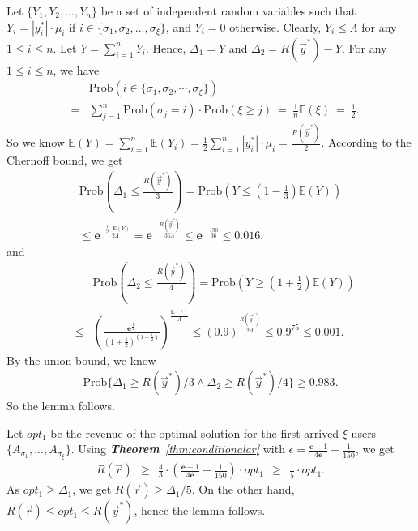 \documentclass[10pt,journal,compsoc]{IEEEtran}
\begin{document}
\begin{IEEEproof} 
Let $\{Y_1,Y_2,...,Y_n\}$ be a set of independent random variables such that  $Y_{i}=|y^*_{i}|\cdot \mu_{i}$ if $i\in \{\sigma_1,\sigma_2,...,\sigma_{\xi}\}$, and $Y_{i}=0$ otherwise. Clearly, $Y_i\leq \Lambda$ for any $1\leq i\leq n$. Let $Y=\sum_{i=1}^n Y_{i}$. Hence, $\Delta_1=Y$ and $\Delta_2=R(\vec{y}^*)-Y$. For any $1\leq i\leq n$, we have
\begin{eqnarray}
    &&\mathrm{Prob}\left(i\in\{\sigma_1,\sigma_2,\cdots,\sigma_{\xi}\}\right) \nonumber\\
    &=& \sum_{j=1}^n \mathrm{Prob}(\sigma_j=i)\cdot \mathrm{Prob}(\xi\geq j)~=~\frac{1}{n}\mathbb{E}(\xi)~=~\frac{1}{2}. \nonumber
  \end{eqnarray}
So we know $\mathbb{E}(Y) = \sum_{i=1}^n \mathbb{E}(Y_i) = \frac{1}{2}\sum_{i=1}^n |y^*_{i}|\cdot \mu_{i} = \frac{R(\vec{y}^*)}{2}$. According to the Chernoff bound, we get
\begin{eqnarray}
    \mathrm{Prob}\left(\Delta_1\leq \frac{R(\vec{y}^*)}{3}\right)=\mathrm{Prob}\left(Y\leq \left(1-\frac{1}{3}\right)\mathbb{E}(Y) \right) \nonumber\\
    \leq \mathbf{e}^{\frac{-\frac{1}{9}\cdot \mathrm{E}(Y)}{2\Lambda}} = \mathbf{e}^{-\frac{R(\vec{y}^*)}{36\Lambda}} \leq \mathbf{e}^{-\frac{150}{36}}\leq 0.016, \nonumber
  \end{eqnarray}
and
\begin{eqnarray}
&&\mathrm{Prob}\left(\Delta_2\leq \frac{R(\vec{y}^*)}{4}\right)=\mathrm{Prob}\left(Y\geq \left(1+\frac{1}{2}\right)\mathbb{E}(Y) \right) \nonumber\\
&\leq& \left(\frac{\mathbf{e}^{\frac{1}{2}}}{(1+\frac{1}{2})^{(1+\frac{1}{2})}} \right)^\frac{\mathrm{E}(Y)}{\Lambda}\leq (0.9)^\frac{R(\vec{y}^*)}{2\Lambda} \leq 0.9^{75}\leq 0.001. \nonumber
\end{eqnarray}
By the union bound, we know
\begin{eqnarray}
\mathrm{Prob}\{\Delta_1\geq {R(\vec{y}^*)}/{3}\wedge \Delta_2\geq {R(\vec{y}^*)}/{4}\}\geq 0.983. \nonumber
\end{eqnarray}
So the lemma follows.
\end{IEEEproof}

\begin{IEEEproof} 
Let $opt_1$ be the revenue of the optimal solution for the first arrived $\xi$ users $\{A_{\sigma_1},...,A_{\sigma_{\xi}}\}$. Using \textit{\textbf{Theorem}~\ref{thm:conditionalar}} with $\epsilon=\frac{\mathbf{e}-1}{4\mathbf{e}}-\frac{1}{150}$, we get
\begin{eqnarray}
R(\vec{r})~~\geq~~\frac{4}{3}\cdot \left(\frac{\mathbf{e}-1}{4\mathbf{e}}-\frac{1}{150}\right)\cdot opt_1~~\geq~~\frac{1}{5}\cdot opt_1. \nonumber
\end{eqnarray}
As $opt_1\geq \Delta_1$, we get $R(\vec{r})\geq \Delta_1/5$. On the other hand, $R(\vec{r})\leq  opt_1\leq  R(\vec{y}^*)$, hence the lemma follows.
\end{IEEEproof}
\end{document}
